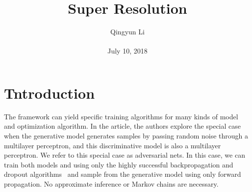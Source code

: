 \documentclass[10pt,twocolumn,letterpaper]{article}
\begin{document}
\author{Qingyun Li\\\\
July 10, 2018}        
\title{Super Resolution}

\maketitle

\section{Tntroduction}
\par The  framework can yield specific training algorithms for many kinds of model and optimization algorithm. In the article, the authors explore the special case when the generative model generates samples by passing random noise through a multilayer perceptron, and this discriminative model is also a multilayer perceptron. We refer to this special case as adversarial nets. In this case, we can train both models and using only the highly successful backpropagation and dropout algorithms~\cite{Hinton2012Improving} and sample from the generative model using only forward propagation. No approximate inference or Markov chains are necessary.
\end{document}
